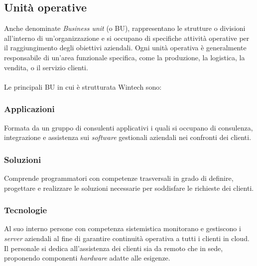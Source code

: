 \subsection{Unità operative}
Anche denominate \emph{Business unit} (o BU), rappresentano le strutture o divisioni all'interno di un'organizzazione e si occupano di specifiche attività operative per il raggiungimento degli obiettivi aziendali. Ogni unità operativa è generalmente responsabile di un'area funzionale specifica, come la produzione, la logistica, la vendita, o il servizio clienti.\\\\
Le principali BU in cui è strutturata Wintech sono:

\subsubsection*{Applicazioni}
Formata da un gruppo di consulenti applicativi i quali si occupano di consulenza, integrazione e assistenza sui \emph{software} gestionali aziendali nei confronti dei clienti. 

\subsubsection*{Soluzioni}
Comprende programmatori con competenze trasversali in grado di definire, progettare e realizzare le soluzioni necessarie per soddisfare le richieste dei clienti. 

\subsubsection*{Tecnologie}
Al suo interno persone con competenza sistemistica monitorano e gestiscono i \emph{server} aziendali al fine di garantire continuità operativa a tutti i clienti in \gls{cloud}. Il personale si dedica all'assistenza dei clienti sia da remoto che in sede, proponendo componenti \emph{hardware} adatte alle esigenze. 

